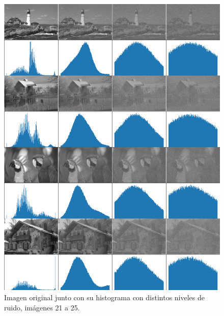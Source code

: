 \begin{figure}
    \centering
    \includegraphics[width=\textwidth]{figuras/img_hist_noise_5.png}
    \caption{Imagen original junto con su histograma con distintos niveles de ruido, im\'agenes 21 a 25.}
\end{figure}

